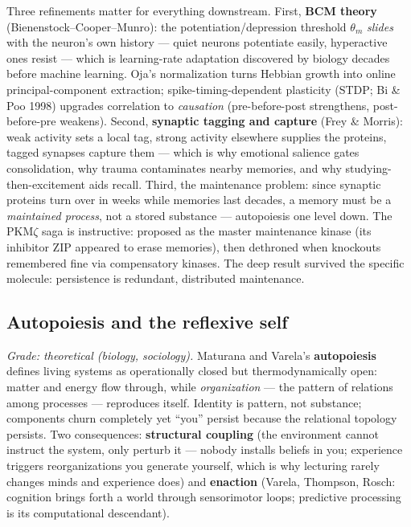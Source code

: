 \documentclass[11pt]{article}
\begin{document}
Three refinements matter for everything downstream. First, \textbf{BCM theory} (Bienenstock--Cooper--Munro): the potentiation/depression threshold $\theta_m$ \emph{slides} with the neuron's own history --- quiet neurons potentiate easily, hyperactive ones resist --- which is learning-rate adaptation discovered by biology decades before machine learning. Oja's normalization turns Hebbian growth into online principal-component extraction; spike-timing-dependent plasticity (STDP; Bi \& Poo 1998) upgrades correlation to \emph{causation} (pre-before-post strengthens, post-before-pre weakens). Second, \textbf{synaptic tagging and capture} (Frey \& Morris): weak activity sets a local tag, strong activity elsewhere supplies the proteins, tagged synapses capture them --- which is why emotional salience gates consolidation, why trauma contaminates nearby memories, and why studying-then-excitement aids recall. Third, the maintenance problem: since synaptic proteins turn over in weeks while memories last decades, a memory must be a \emph{maintained process}, not a stored substance --- autopoiesis one level down. The PKM$\zeta$ saga is instructive: proposed as the master maintenance kinase (its inhibitor ZIP appeared to erase memories), then dethroned when knockouts remembered fine via compensatory kinases. The deep result survived the specific molecule: persistence is redundant, distributed maintenance.

\subsection{Autopoiesis and the reflexive self}

\textit{Grade: theoretical (biology, sociology).} Maturana and Varela's \textbf{autopoiesis} \citep{maturana1980} defines living systems as operationally closed but thermodynamically open: matter and energy flow through, while \emph{organization} --- the pattern of relations among processes --- reproduces itself. Identity is pattern, not substance; components churn completely yet ``you'' persist because the relational topology persists. Two consequences: \textbf{structural coupling} (the environment cannot instruct the system, only perturb it --- nobody installs beliefs in you; experience triggers reorganizations you generate yourself, which is why lecturing rarely changes minds and experience does) and \textbf{enaction} (Varela, Thompson, Rosch: cognition brings forth a world through sensorimotor loops; predictive processing is its computational descendant).
\end{document}
